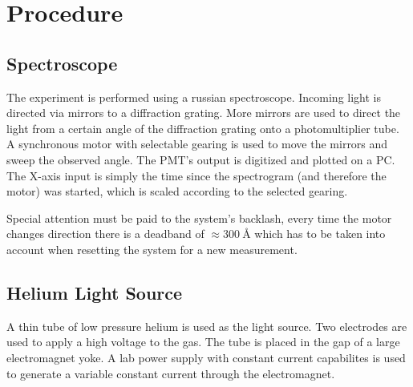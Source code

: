 \chapter{Procedure}

\section{Spectroscope}
The experiment is performed using a russian spectroscope. 
Incoming light is directed via mirrors to a diffraction grating.
More mirrors are used to direct the light from a certain angle of the diffraction grating onto a photomultiplier tube. 
A synchronous motor with selectable gearing is used to move the mirrors and sweep the observed angle.
The PMT's output is digitized and plotted on a PC.
The X-axis input is simply the time since the spectrogram (and therefore the motor) was started, which is scaled according to the selected gearing.

Special attention must be paid to the system's backlash, every time the motor changes direction there is a deadband of $\approx\SI{300}{\angstrom}$ which has to be taken into account when resetting the system for a new measurement.

\section{Helium Light Source}
A thin tube of low pressure helium is used as the light source.
Two electrodes are used to apply a high voltage to the gas.
The tube is placed in the gap of a large electromagnet yoke.
A lab power supply with constant current capabilites is used to generate a variable constant current through the electromagnet.
